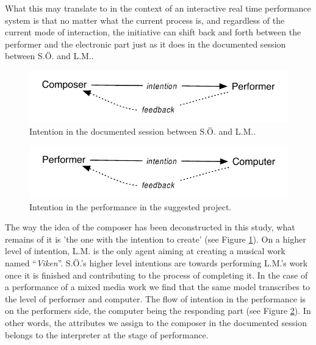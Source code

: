 \documentclass[10pt,letterpaper]{article}
\begin{document}
What this may translate to in the context of an interactive real time performance
system is that no matter what the current process is, and regardless of
the current mode of interaction, the initiative can shift back and forth
between the performer and the electronic part just as it does in the
documented session between S.{\"O}. and L.M..

 \begin{figure}[!t]
 \begin{center}
  \includegraphics[width=1\columnwidth]{img/composer-performer}
  \caption{Intention in the documented session between S.{\"O}. and L.M..}
  \label{cmp_perf}
 \end{center}
 \end{figure}

 \begin{figure}[!t]
  \begin{center}
   \includegraphics[width=1\columnwidth]{img/performer-computer}
   \caption{Intention in the performance in the suggested project. }
   \label{perf_cmp}
   \end{center}
 \end{figure}

The way the idea of the composer has been deconstructed in this study,
what remains of it is 'the one with the intention to create' (see Figure
\ref{cmp_perf}). 
On a higher level of intention, L.M. is the only agent
aiming at creating a musical work named ``\emph{Viken}''. S.{\"O}.'s higher level
intentions are towards performing L.M.'s work once it is finished and
contributing to the process of completing it.
In the case of a performance of a mixed media work we find that the same
model transcribes to the level of performer and computer. The
flow of intention in the performance is on the performers side, the
computer being the responding part (see Figure
\ref{perf_cmp}). In other words, the attributes we
assign to the composer in the documented session belongs to the
interpreter at the stage of performance.
\end{document}
